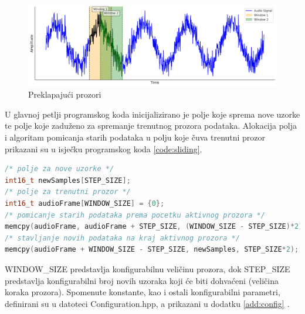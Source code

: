\begin{figure}[htb]
    \centering
    \includegraphics[width=0.9\linewidth]{Chapters/struktura_sustava/generiranje_znacajki/sliding.png} 
    \caption{Preklapajući prozori}
    \label{pic:sliding}
\end{figure}

U glavnoj petlji programskog koda inicijalizirano je polje koje sprema nove uzorke te 
polje koje zaduženo za spremanje trenutnog prozora podataka. Alokacija polja i algoritam
pomicanja starih podataka u polju koje čuva trenutni prozor prikazani su u isječku programskog
koda \ref{code:sliding}.

\begin{lstlisting}[language=C++, caption=Algoritam za korištenje novodohvaćenih podataka, label=code:sliding]
/* polje za nove uzorke */
int16_t newSamples[STEP_SIZE];
/* polje za trenutni prozor */
int16_t audioFrame[WINDOW_SIZE] = {0};
/* pomicanje starih podataka prema pocetku aktivnog prozora */
memcpy(audioFrame, audioFrame + STEP_SIZE, (WINDOW_SIZE - STEP_SIZE)*2);
/* stavljanje novih podataka na kraj aktivnog prozora */
memcpy(audioFrame + WINDOW_SIZE - STEP_SIZE, newSamples, STEP_SIZE*2);
\end{lstlisting}

WINDOW\_SIZE predstavlja konfigurabilnu veličinu prozora, dok STEP\_SIZE predstavlja 
konfigurabilni broj novih uzoraka koji će biti dohvaćeni (veličina koraka prozora).
Spomenute konstante, kao i ostali konfigurabilni parametri, definirani su u 
datoteci Configuration.hpp, a prikazani u dodatku \ref{add:config} .


